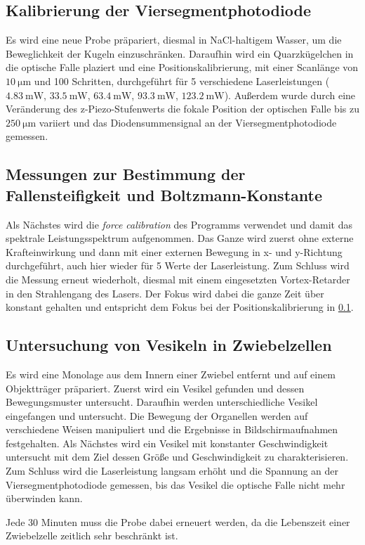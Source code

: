   \subsection{Kalibrierung der Viersegmentphotodiode}
  \label{sec:Kalib}
    Es wird eine neue Probe präpariert, diesmal in NaCl-haltigem Wasser, um die Beweglichkeit der Kugeln einzuschränken. Daraufhin wird ein Quarzkügelchen in die optische Falle plaziert und eine Positionskalibrierung, mit einer Scanlänge von $\SI{10}{\micro\metre}$ und 100 Schritten, durchgeführt für 5 verschiedene Laserleistungen ($\SI{4.83}{\milli\watt}$, $\SI{33.5}{\milli\watt}$, $\SI{63.4}{\milli\watt}$, $\SI{93.3}{\milli\watt}$, $\SI{123.2}{\milli\watt}$).
    Außerdem wurde durch eine Veränderung des z-Piezo-Stufenwerts die fokale Position der optischen Falle bis zu $\SI{250}{\micro\metre}$ variiert und das Diodensummensignal an der Viersegmentphotodiode gemessen.
  \subsection{Messungen zur Bestimmung der Fallensteifigkeit und Boltzmann-Konstante}
    Als Nächstes wird die \textit{force calibration} des Programms verwendet und damit das spektrale Leistungsspektrum aufgenommen. Das Ganze wird zuerst ohne externe Krafteinwirkung und dann mit einer externen Bewegung in x- und y-Richtung durchgeführt, auch hier wieder für 5 Werte der Laserleistung. Zum Schluss wird die Messung erneut wiederholt, diesmal mit einem eingesetzten Vortex-Retarder in den Strahlengang des Lasers.
    Der Fokus wird dabei die ganze Zeit über konstant gehalten und entspricht dem Fokus bei der Positionskalibrierung in \ref{sec:Kalib}.
  \subsection{Untersuchung von Vesikeln in Zwiebelzellen}
    Es wird eine Monolage aus dem Innern einer Zwiebel entfernt und auf einem Objektträger präpariert.
    Zuerst wird ein Vesikel gefunden und dessen Bewegungsmuster untersucht. Daraufhin werden unterschiedliche Vesikel eingefangen und untersucht. Die Bewegung der Organellen werden auf verschiedene Weisen manipuliert und die Ergebnisse in Bildschirmaufnahmen festgehalten.
    Als Nächstes wird ein Vesikel mit konstanter Geschwindigkeit untersucht mit dem Ziel dessen Größe und Geschwindigkeit zu charakterisieren.
    Zum Schluss wird die Laserleistung langsam erhöht und die Spannung an der Viersegmentphotodiode gemessen, bis das Vesikel die optische Falle nicht mehr überwinden kann.
    
    Jede 30 Minuten muss die Probe dabei erneuert werden, da die Lebenszeit einer Zwiebelzelle zeitlich sehr beschränkt ist.